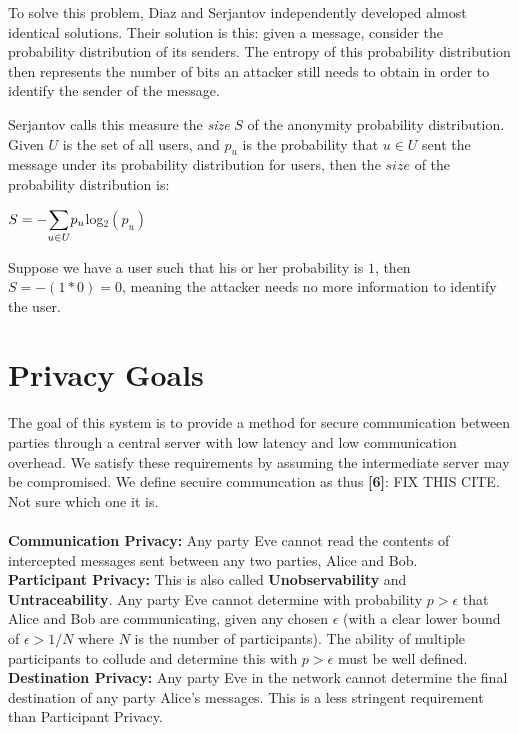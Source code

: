 \documentclass[twocolumn,11pt,english]{paper}
\begin{document}
To solve this problem, Diaz \cite{Diaz02} and Serjantov \cite{Serj02} independently developed almost identical solutions. Their solution is this: given a message, consider the probability distribution of its senders. The entropy of this probability distribution then represents the number of bits an attacker still needs to obtain in order to identify the sender of the message. 

Serjantov \cite{Serj02} calls this measure the \textit{size} $S$ of the anonymity probability distribution. Given $U$ is the set of all users, and $p_u$ is the probability that $u \in U$ sent the message under its probability distribution for users, then the $size$ of the probability distribution is:

\begin{center}
  $ S = - \mathlarger{\sum}\limits_{u \in U} p_u $log$_2(p_u)$
\end{center}

Suppose we have a user such that his or her probability is $1$, then  $S = -(1 * 0) = 0$, meaning the attacker needs no more information to identify the user. 



\section{Privacy Goals}
The goal of this system is to provide a method for secure communication between parties through a central server with low latency and low communication overhead. We satisfy these requirements by assuming the intermediate server may be compromised. We define secuire communcation as thus \textbf{[6]}: FIX THIS CITE. Not sure which one it is.
\\\\\textbf{Communication Privacy:} Any party Eve cannot read the contents of intercepted messages sent between any two parties, Alice and Bob. 
\\\textbf{Participant Privacy:} This is also called \textbf{Unobservability} and \textbf{Untraceability}. Any party Eve cannot determine with probability $p > \epsilon$ that Alice and Bob are communicating, given any chosen $\epsilon$ (with a clear lower bound of $\epsilon > 1/N$ where $N$ is the number of participants). The ability of multiple participants to collude and determine this with $p > \epsilon$ must be well defined.
\\\textbf{Destination Privacy:} Any party Eve in the network cannot determine the final destination of any party Alice's messages. This is a less stringent requirement than Participant Privacy.
\end{document}
